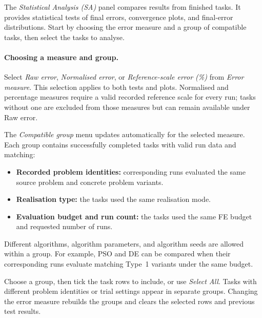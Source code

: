 \documentclass[journal,onecolumn]{IEEEtran}
\begin{document}
The \emph{Statistical Analysis (SA)} panel compares results from finished tasks. It provides statistical tests of final errors, convergence plots, and final-error distributions. Start by choosing the error measure and a group of compatible tasks, then select the tasks to analyse.

\paragraph{Choosing a measure and group.}
Select \emph{Raw error}, \emph{Normalised error}, or \emph{Reference-scale error (\%)} from \emph{Error measure}. This selection applies to both tests and plots. Normalised and percentage measures require a valid recorded reference scale for every run; tasks without one are excluded from those measures but can remain available under Raw error.

The \emph{Compatible group} menu updates automatically for the selected measure. Each group contains successfully completed tasks with valid run data and matching:
\begin{itemize}
    \item \textbf{Recorded problem identities:} corresponding runs evaluated the same source problem and concrete problem variants.
    \item \textbf{Realisation type:} the tasks used the same realisation mode.
    \item \textbf{Evaluation budget and run count:} the tasks used the same FE budget and requested number of runs.
\end{itemize}
Different algorithms, algorithm parameters, and algorithm seeds are allowed within a group. For example, PSO and DE can be compared when their corresponding runs evaluate matching Type~1 variants under the same budget.

Choose a group, then tick the task rows to include, or use \emph{Select All}. Tasks with different problem identities or trial settings appear in separate groups. Changing the error measure rebuilds the groups and clears the selected rows and previous test results.
\end{document}
